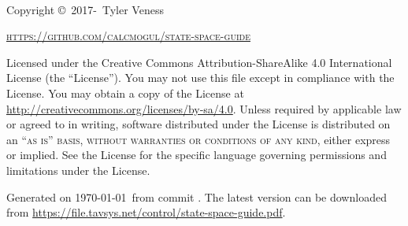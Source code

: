 ~\vfill
\thispagestyle{empty}

Copyright \copyright\ 2017-\the\year~Tyler Veness

\textsc{\url{https://github.com/calcmogul/state-space-guide}}

Licensed under the Creative Commons Attribution-ShareAlike 4.0 International
License (the ``License''). You may not use this file except in compliance with
the License. You may obtain a copy of the License at
\url{http://creativecommons.org/licenses/by-sa/4.0}. Unless required by
applicable law or agreed to in writing, software distributed under the License
is distributed on an \textsc{``as is'' basis, without warranties or conditions
of any kind}, either express or implied. See the License for the specific
language governing permissions and limitations under the License.

Generated on \monthdayyeardate\today~from commit
\!\!. The latest version can be downloaded from
\url{https://file.tavsys.net/control/state-space-guide.pdf}.
